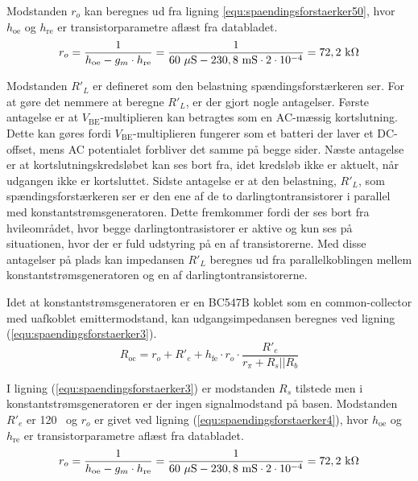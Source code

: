 Modstanden $r_o$ kan beregnes ud fra ligning \ref{equ:spaendingsforstaerker50},  hvor $h_{\mathrm{oe}}$ og $h_{\mathrm{re}}$ er transistorparametre aflæst fra databladet.
\begin{equation}
\label{equ:spaendingsforstaerker50}
r_o = \frac{1}{h_{\mathrm{oe}} - g_m \cdot h_{\mathrm{re}}} = \frac{1}{60~\mathrm{\mu S} - 230,8~\mathrm{mS} \cdot 2 \cdot 10^{-4}} = 72,2~\mathrm{k}\ohm
\end{equation}

Modstanden $R'_L$ er defineret som den belastning spændingsforstærkeren ser. For at gøre det nemmere at beregne $R'_L$, er der gjort nogle antagelser. Første antagelse er at $V_\mathrm{BE}$-multiplieren kan betragtes som en AC-mæssig kortslutning. Dette kan gøres fordi $V_\mathrm{BE}$-multiplieren fungerer som et batteri der laver et DC-offset, mens AC potentialet  forbliver det samme på begge sider. Næste antagelse er at kortslutningskredsløbet kan ses bort fra, idet kredsløb ikke er aktuelt, når udgangen ikke er kortsluttet. Sidste antagelse er at den belastning, $R'_L$, som spændingsforstærkeren ser er den ene af de to darlingtontransistorer i parallel med konstantstrømsgeneratoren. Dette fremkommer fordi der ses bort fra hvileområdet, hvor begge darlingtontrasistorer er aktive og kun ses på situationen, hvor der er fuld udstyring på en af transistorerne.
Med disse antagelser på plads kan impedansen $R'_L$ beregnes ud fra parallelkoblingen mellem konstantstrømsgeneratoren og en af darlingtontransistorerne.

Idet at konstantstrømsgeneratoren er en BC547B koblet som en common-collector med uafkoblet emittermodstand, kan udgangsimpedansen beregnes ved ligning (\ref{equ:spaendingsforstaerker3}).
\begin{equation}
\label{equ:spaendingsforstaerker3}
R_{\mathrm{oc}} = r_o + R'_e + h_{\mathrm{fe}} \cdot r_o \cdot \frac{R'_e}{r_{\pi} + R_s || R_b}
\end{equation}

I ligning (\ref{equ:spaendingsforstaerker3}) er modstanden $R_s$ tilstede men i konstantstrømsgeneratoren er der ingen signalmodstand på basen. Modstanden $R'_e$ er 120 \ohm~og $r_o$ er givet ved ligning (\ref{equ:spaendingsforstaerker4}), hvor $h_{\mathrm{oe}}$ og $h_{\mathrm{re}}$ er transistorparametre aflæst fra databladet.
\begin{equation}
\label{equ:spaendingsforstaerker4}
r_o = \frac{1}{h_{\mathrm{oe}} - g_m \cdot h_{\mathrm{re}}} = \frac{1}{60~\mathrm{\mu S} - 230,8~\mathrm{mS} \cdot 2 \cdot 10^{-4}} = 72,2~\mathrm{k}\ohm
\end{equation}


